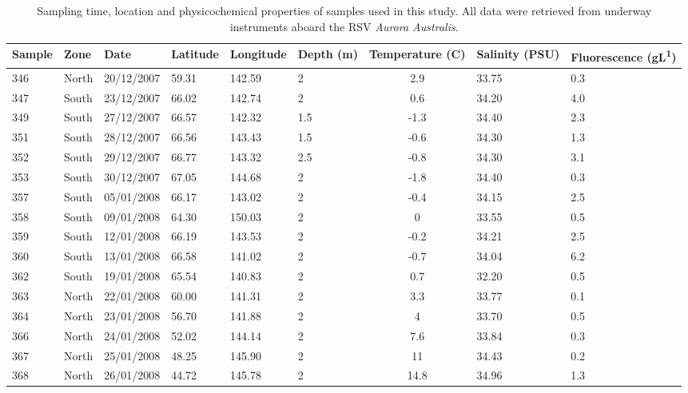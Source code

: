 \begin{landscape}
\begin{table}
\centering
\sffamily
\caption[Details of samples used in Polar Front study]{\sffamily{}Sampling time, location and physicochemical properties of samples used in this study.
All data were retrieved from underway instruments aboard the RSV \textit{Aurora Australis}.}
\label{tab:samplelist}
\begin{tabu} to\linewidth{llllllS[table-format=2.1,table-number-alignment=left]ll}
\toprule
\textbf{Sample} & \textbf{Zone} & \textbf{Date} & \textbf{Latitude} & \textbf{Longitude} & \textbf{Depth (m)} & \textbf{Temperature (\textdegree{}C)} & \textbf{Salinity (PSU)} & \textbf{Fluorescence (\textmu{}gL\textsuperscript{\textminus{}1})}\\
\midrule

346 & North & 20/12/2007 & \textminus{}59.31 & 142.59 & 2 & 2.9 & 33.75 & 0.3\\
347 & South & 23/12/2007 & \textminus{}66.02 & 142.74 & 2 & 0.6 & 34.20 & 4.0\\
349 & South & 27/12/2007 & \textminus{}66.57 & 142.32 & 1.5 & -1.3 & 34.40 & 2.3\\
351 & South & 28/12/2007 & \textminus{}66.56 & 143.43 & 1.5 & -0.6 & 34.30 & 1.3\\
352 & South & 29/12/2007 & \textminus{}66.77 & 143.32 & 2.5 & -0.8 & 34.30 & 3.1\\
353 & South & 30/12/2007 & \textminus{}67.05 & 144.68 & 2 & -1.8 & 34.40 & 0.3\\
357 & South & 05/01/2008 & \textminus{}66.17 & 143.02 & 2 & -0.4 & 34.15 & 2.5\\
358 & South & 09/01/2008 & \textminus{}64.30 & 150.03 & 2 & 0 & 33.55 & 0.5\\
359 & South & 12/01/2008 & \textminus{}66.19 & 143.53 & 2 & -0.2 & 34.21 & 2.5\\
360 & South & 13/01/2008 & \textminus{}66.58 & 141.02 & 2 & -0.7 & 34.04 & 6.2\\
362 & South & 19/01/2008 & \textminus{}65.54 & 140.83 & 2 & 0.7 & 32.20 & 0.5\\
363 & North & 22/01/2008 & \textminus{}60.00 & 141.31 & 2 & 3.3 & 33.77 & 0.1\\
364 & North & 23/01/2008 & \textminus{}56.70 & 141.88 & 2 & 4 & 33.70 & 0.5\\
366 & North & 24/01/2008 & \textminus{}52.02 & 144.14 & 2 & 7.6 & 33.84 & 0.3\\
367 & North & 25/01/2008 & \textminus{}48.25 & 145.90 & 2 & 11 & 34.43 & 0.2\\
368 & North & 26/01/2008 & \textminus{}44.72 & 145.78 & 2 & 14.8 & 34.96 & 1.3\\

\bottomrule
\end{tabu}
\end{table}
\end{landscape}
